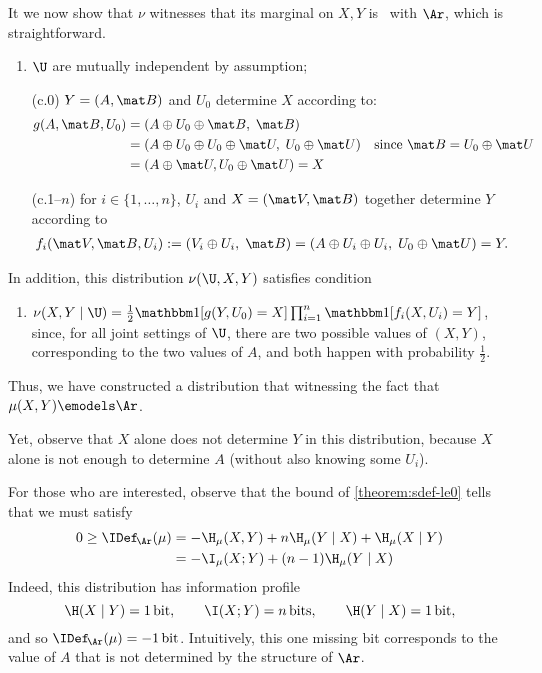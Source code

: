 \begin{subappendices}
\begin{example}
    It we now show that $\nu$ witnesses that its marginal on $X,Y$ is 
        \scible\ with $\Ar$, which is straightforward.
    \begin{enumerate}[label=(\alph*), start=2]
        \item $\U$ are mutually independent by assumption;
        \item[(c.0)] $Y = (A, \mat B)$ and $U_0$ determine $X$ according to:
        \begin{align*}
            g(A, \mat B, U_0) &= (A \oplus U_0 \oplus \mat B,\; \mat B) \\
                &= (A \oplus U_0 \oplus U_0 \oplus \mat U,\;  U_0 \oplus \mat U) & \text{since } \mat B =U_0 \oplus \mat U \\
                &= (A \oplus \mat U, U_0 \oplus \mat U) = X
        \end{align*}
        \item[(c.1--$n$)] for $i \in \{1, \ldots, n\}$, $U_i$ and $X = (\mat V, \mat B)$ together determine $Y$ according to
        \begin{align*}
            f_i(\mat V, \mat B, U_i) := (V_i \oplus U_i,\; \mat B) 
                = (A \oplus U_i \oplus U_i,\; U_0 \oplus \mat U) = Y.
        \end{align*}
    \end{enumerate}
    In addition, this distribution $\nu(\U, X,Y)$ satisfies condition
    \begin{enumerate}[label=(\alph*), start=4]
    \item $\nu(X,Y \mid \U) = \frac{1}{2} \mathbbm1[ g(Y, U_0) = X] \prod_{i = 1}^n \mathbbm1[ f_i(X, U_i) = Y]$,
    since, for all joint settings of $\U$, there are two possible values of $(X,Y)$, corresponding to the two values of $A$, and both happen with probability $\frac12$. 
    \end{enumerate}
    
    Thus, we have constructed a distribution that witnessing the fact that $\mu(X,Y) \emodels \Ar$.  
    
    Yet, observe that $X$ alone does not determine $Y$ in this distribution, because $X$ alone is not enough to determine $A$ (without also knowing some $U_i$). 
        
    For those who are interested, 
    observe that the bound of \cref{theorem:sdef-le0} tells that
    we must satisfy 
    \begin{align*}
    0 \ge
        \IDef_{\!\Ar}(\mu)
        &= - \H_\mu(X,Y) + n \H_\mu(Y \mid  X) + \H_\mu(X \mid Y) \\
        &= - \I_\mu(X;Y) + (n-1) \H_\mu(Y \mid X)  
    \end{align*}
    Indeed, this distribution has information profile 
    \[
        \H(X \mid Y) = 1\,\text{bit},\qquad
        \I(X ; Y) = n\,\text{bits},\qquad
        \H(Y \mid X) = 1\,\text{bit},
    \]
    and so $\IDef_{\!\Ar}(\mu) = -1\,\text{bit}$. 
    Intuitively, this one missing bit corresponds to the value of $A$ that is not determined by the structure of $\Ar$.
\end{example}



\end{subappendices}
